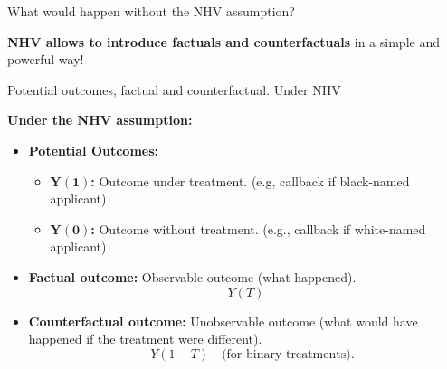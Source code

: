 \documentclass[aspectratio=169]{beamer}
\begin{document}
\begin{frame}{What would happen without the NHV assumption?}
\begin{minipage}{0.45\textwidth}
\end{minipage}

\begin{center}
    \textbf{NHV allows to introduce factuals and counterfactuals} in a simple and powerful way!
\end{center}

\end{frame}

\begin{frame}{Potential outcomes, factual and counterfactual. Under NHV}
\vspace{-0.4cm}

\begin{center}
    \textbf{Under the NHV assumption:}
\end{center}

\begin{itemize}
    \item \textbf{Potential Outcomes:}
    \begin{itemize}
        \item[$\bullet$] $\pmb{Y(1)}$\textbf{:} Outcome under treatment. \textcolor{deepskyblue3}{(e.g, callback if  black-named applicant)}
        \vspace{0.1cm}
        
        \item[$\bullet$] $\pmb{Y(0)}$\textbf{:} Outcome without treatment. \textcolor{deepskyblue3}{(e.g., callback if white-named applicant)}
    \end{itemize}

    \item \textbf{Factual outcome:} Observable outcome (what happened). 
    $$Y(T)$$
    
    \item \textbf{Counterfactual outcome:} Unobservable outcome (what would have happened if the treatment were different). 
    $$\quad Y(1-T)\quad \text{(for binary treatments)}.$$
\end{itemize}

\end{frame}
\end{document}
